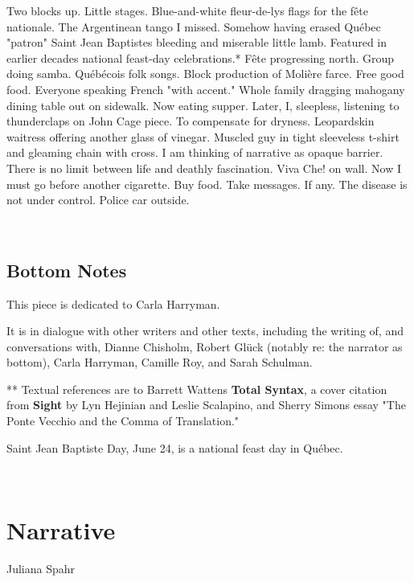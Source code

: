 Two blocks up. Little stages. Blue-and-white fleur-de-lys flags for the
fête nationale. The Argentinean tango I missed. Somehow having erased
Québec "patron" Saint Jean Baptistes bleeding and miserable little lamb.
Featured in earlier decades national feast-day celebrations.* Fête
progressing north. Group doing samba. Québécois folk songs. Block
production of Molière farce. Free good food. Everyone speaking French
"with accent." Whole family dragging mahogany dining table out on
sidewalk. Now eating supper. Later, I, sleepless, listening to
thunderclaps on John Cage piece. To compensate for dryness. Leopardskin
waitress offering another glass of vinegar. Muscled guy in tight
sleeveless t-shirt and gleaming chain with cross. I am thinking of
narrative as opaque barrier. There is no limit between life and deathly
fascination. Viva Che! on wall. Now I must go before another cigarette.
Buy food. Take messages. If any. The disease is not under control.
Police car outside.

~

\hypertarget{bottom-notes}{%
\subsection{Bottom Notes}\label{bottom-notes}}

This piece is dedicated to Carla Harryman.

It is in dialogue with other writers and other texts, including the
writing of, and conversations with, Dianne Chisholm, Robert Glück
(notably re: the narrator as bottom), Carla Harryman, Camille Roy, and
Sarah Schulman.

** Textual references are to Barrett Wattens \textbf{Total Syntax}, a
cover citation from \textbf{Sight} by Lyn Hejinian and Leslie Scalapino,
and Sherry Simons essay "The Ponte Vecchio and the Comma of
Translation."

Saint Jean Baptiste Day, June 24, is a national feast day in Québec.

~

\hypertarget{narrative}{%
\section{Narrative}\label{narrative}}

Juliana Spahr

